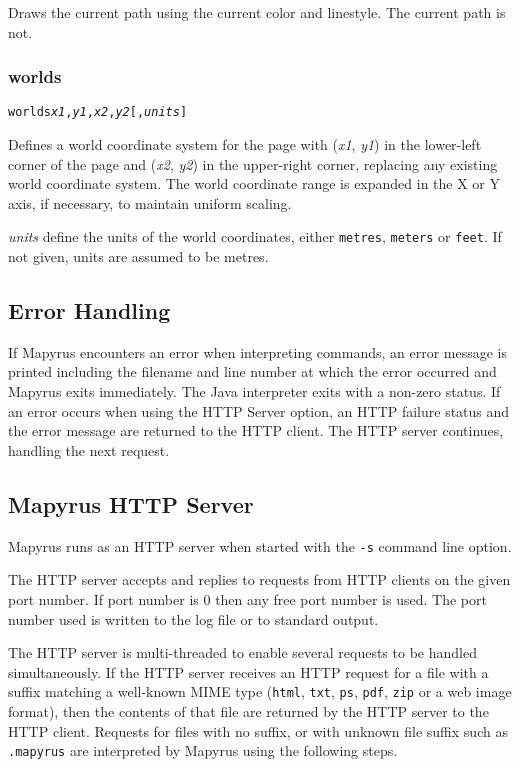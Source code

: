 Draws the current path using the current color and linestyle.
The current path is not.

\subsubsection{worlds}

\begin{alltt}
worlds \textit{x1}, \textit{y1}, \textit{x2}, \textit{y2} [, \textit{units}]
\end{alltt}

Defines a world coordinate system for the page with
(\textit{x1}, \textit{y1}) in the lower-left corner of the page and
(\textit{x2}, \textit{y2}) in the upper-right corner, replacing any existing
world coordinate system.
The world coordinate range is expanded in the X or Y axis,
if necessary, to maintain uniform scaling.

\textit{units} define the units of the world coordinates,
either \texttt{metres}, \texttt{meters} or \texttt{feet}.
If not given, units are assumed to be metres.

\subsection{Error Handling}

If Mapyrus encounters an error when interpreting commands,
an error message is printed including the filename and line number
at which the error occurred and Mapyrus exits immediately.
The Java interpreter exits with a non-zero status.
If an error occurs when using the HTTP Server
option, an HTTP failure status and the error message
are returned to the HTTP client.  The HTTP server continues,
handling the next request.

\subsection{Mapyrus HTTP Server}

Mapyrus runs as an HTTP server when started with the \texttt{-s} command line
option.

The HTTP server accepts and replies to requests from HTTP clients on the given
port number.  If port number is 0 then any free port number is used.  The port
number used is written to the log file or to standard output.

The HTTP server is multi-threaded to enable several requests to be handled
simultaneously.  If the HTTP server receives an HTTP request for a file with a
suffix matching a well-known MIME type (\texttt{html}, \texttt{txt},
\texttt{ps}, \texttt{pdf}, \texttt{zip} or a web image format), then the
contents of that file are returned by the HTTP server to the HTTP client.
Requests for files with no suffix, or with unknown file suffix
such as \texttt{.mapyrus} are interpreted
by Mapyrus using the following steps.

